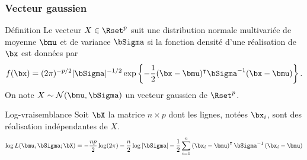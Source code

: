 \documentclass{beamer}\usepackage[]{graphicx}\usepackage[]{color}
\begin{document}
\begin{frame}
  \frametitle{Vecteur gaussien}

  \begin{block}{Définition}
    Le vecteur $X\in\Rset^p$ suit une distribution normale multivariée
    de moyenne $\bmu$ et de  variance $\bSigma$ si la fonction densité
    d'une réalisation de $\bx$ est données par
\begin{equation*}    
f(\bx) = (2\pi)^{-p/2} | \bSigma|^{-1/2} \exp\left\{-\frac{1}{2}(\bx-\bmu)^\intercal \bSigma^{-1}(\bx-\bmu)\right\}.
\end{equation*}
On note $X\sim\mathcal{N}(\bmu,\bSigma)$ un vecteur gaussien de $\Rset^p$.
   \end{block} 
  
  \vfill
  
  \begin{block}{Log-vraisemblance} Soit $\bX$ la matrice $n\times p$ dont les lignes, notées $\bx_i$, sont des
    réalisation indépendantes de $X$.
    \vspace{-.5cm}
    \begin{equation*}
      \log L(\bmu,\bSigma;  \bX) = -\frac{n p}{2}\log(2\pi)
      - \frac{n}{2} \log |\bSigma| -
      \frac{1}{2}  \sum_{i=1}^n  \left( \bx_i  -  \bmu\right)^\intercal
      \bSigma^{-1} \left( \bx_i - \bmu \right)    \end{equation*}
  \end{block}

\end{frame}
\end{document}
